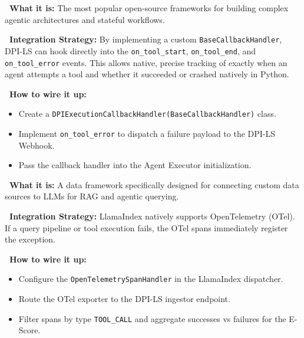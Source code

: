 \documentclass[11pt,a4paper]{article}
\begin{document}
\begin{tcolorbox}[enhanced, colback=gray!5!white, colframe=gray, title={\textbf{\faProjectDiagram\ LangChain \& LangGraph}}, fonttitle=\bfseries, boxrule=1pt, arc=2mm]
\textbf{\color{dpiblue}\faQuestionCircle\ What it is:} The most popular open-source frameworks for building complex agentic architectures and stateful workflows.

\vspace{0.2cm}
\textbf{\color{dpigreen}\faCogs\ Integration Strategy:} By implementing a custom \texttt{BaseCallbackHandler}, DPI-LS can hook directly into the \texttt{on\_tool\_start}, \texttt{on\_tool\_end}, and \texttt{on\_tool\_error} events. This allows native, precise tracking of exactly when an agent attempts a tool and whether it succeeded or crashed natively in Python.

\vspace{0.2cm}
\textbf{\color{dpicloud}\faPlug\ How to wire it up:}
\begin{itemize}
    \item \textbf{\color{gray}\faCode} Create a \texttt{DPIExecutionCallbackHandler(BaseCallbackHandler)} class.
    \item \textbf{\color{gray}\faBug} Implement \texttt{on\_tool\_error} to dispatch a failure payload to the DPI-LS Webhook.
    \item \textbf{\color{gray}\faMicrochip} Pass the callback handler into the Agent Executor initialization.
\end{itemize}
\end{tcolorbox}

\vspace{0.3cm}

\begin{tcolorbox}[enhanced, colback=gray!5!white, colframe=gray, title={\textbf{\faDatabase\ LlamaIndex}}, fonttitle=\bfseries, boxrule=1pt, arc=2mm]
\textbf{\color{dpiblue}\faQuestionCircle\ What it is:} A data framework specifically designed for connecting custom data sources to LLMs for RAG and agentic querying.

\vspace{0.2cm}
\textbf{\color{dpigreen}\faCogs\ Integration Strategy:} LlamaIndex natively supports OpenTelemetry (OTel). If a query pipeline or tool execution fails, the OTel spans immediately register the exception.

\vspace{0.2cm}
\textbf{\color{dpicloud}\faPlug\ How to wire it up:}
\begin{itemize}
    \item \textbf{\color{gray}\faSlidersH} Configure the \texttt{OpenTelemetrySpanHandler} in the LlamaIndex dispatcher.
    \item \textbf{\color{gray}\faNetworkWired} Route the OTel exporter to the DPI-LS ingestor endpoint.
    \item \textbf{\color{gray}\faFilter} Filter spans by type \texttt{TOOL\_CALL} and aggregate successes vs failures for the E-Score.
\end{itemize}
\end{tcolorbox}
\end{document}
